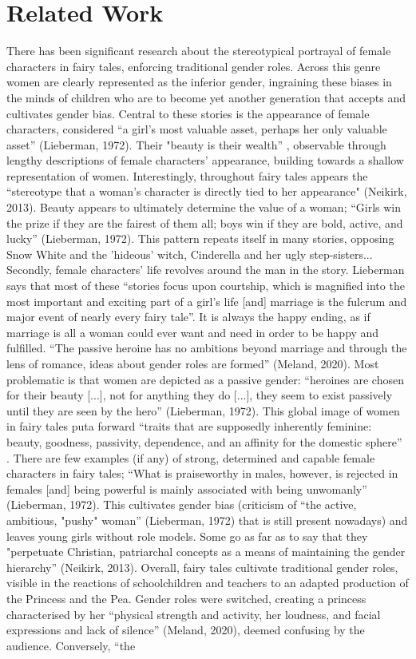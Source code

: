 \documentclass[11pt]{article}
\begin{document}
\section{Related Work}

There has been significant research about the stereotypical portrayal of female characters in fairy tales, enforcing traditional gender roles. Across this genre women are  clearly represented as the inferior gender, ingraining these biases in the minds of children who are to become yet another generation that accepts and cultivates gender bias. Central to these stories is the appearance of female characters, considered “a girl's most valuable asset, perhaps her only valuable asset” (Lieberman, 1972). Their "beauty is their wealth” \cite{Weingart}, observable through lengthy descriptions of female characters’ appearance, building towards a shallow representation of women. Interestingly, throughout fairy tales appears the “stereotype that a woman’s character is directly tied to her appearance" (Neikirk, 2013). Beauty appears to ultimately determine the value of a woman; “Girls win the prize if they are the fairest of them all; boys win if they are bold, active, and lucky” (Lieberman, 1972). This pattern repeats itself in many  stories, opposing Snow White and the 'hideous' witch, Cinderella and her ugly step-sisters... Secondly, female characters’ life revolves around the man in the story. Lieberman says that most of these “stories focus upon courtship, which is magnified into the most important and exciting part of a girl's life [and] marriage is the fulcrum and major event of nearly every fairy tale”. It is always the happy ending, as if marriage is all a woman could ever want and need in order to be happy and fulfilled. “The passive heroine has no ambitions beyond marriage and through the lens of romance, ideas about gender roles are formed” (Meland, 2020). Most problematic is that women are depicted as a passive gender: “heroines are chosen for their beauty [...], not for anything they do [...], they seem to exist passively until they are seen by the hero” (Lieberman, 1972). This global image of women in fairy tales puta forward “traits that are supposedly inherently feminine: beauty, goodness, passivity, dependence, and an affinity for the domestic sphere” \cite{Weingart}. There are few examples (if any) of strong, determined and capable female characters in fairy tales; “What is praiseworthy in males, however, is rejected in females [and] being powerful is mainly associated with being unwomanly” (Lieberman, 1972). This cultivates gender bias (criticism of “the active, ambitious, "pushy" woman” (Lieberman, 1972) that is still present nowadays) and leaves young girls without role models. Some go as far as to say that they "perpetuate Christian, patriarchal concepts as a means of maintaining the gender hierarchy” (Neikirk, 2013). Overall, fairy tales cultivate traditional gender roles, visible in the reactions of schoolchildren and teachers to an adapted production of the Princess and the Pea. Gender roles were switched, creating a princess characterised by her “physical strength and activity, her loudness, and facial expressions and lack of silence” (Meland, 2020), deemed confusing by the audience. Conversely, “the 
\end{document}
